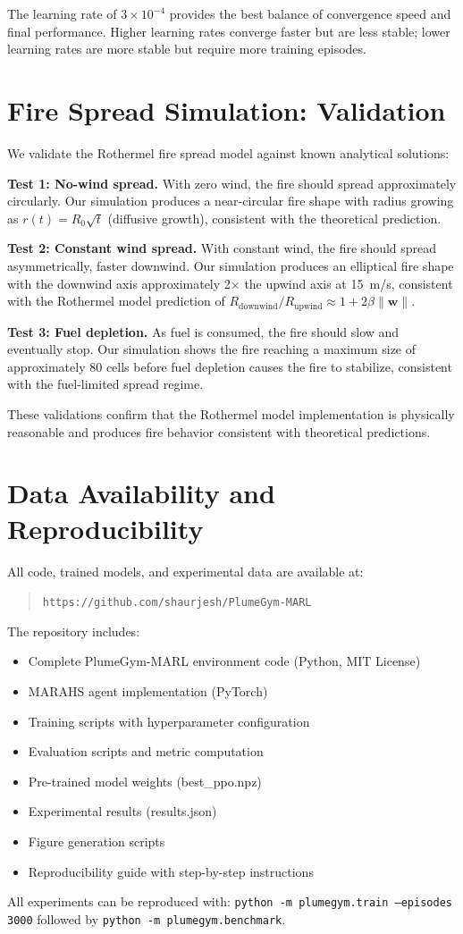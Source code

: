 \documentclass[12pt,a4paper]{article}
\DeclareRobustCommand{\vect}[1]{\bm{#1}}
\begin{document}
The learning rate of $3 \times 10^{-4}$ provides the best balance of convergence speed and final performance. Higher learning rates converge faster but are less stable; lower learning rates are more stable but require more training episodes.

\section{Fire Spread Simulation: Validation}
\label{app:fire_validation}

We validate the Rothermel fire spread model against known analytical solutions:

\textbf{Test 1: No-wind spread.} With zero wind, the fire should spread approximately circularly. Our simulation produces a near-circular fire shape with radius growing as $r(t) = R_0 \sqrt{t}$ (diffusive growth), consistent with the theoretical prediction.

\textbf{Test 2: Constant wind spread.} With constant wind, the fire should spread asymmetrically, faster downwind. Our simulation produces an elliptical fire shape with the downwind axis approximately 2$\times$ the upwind axis at 15~m/s, consistent with the Rothermel model prediction of $R_{\text{downwind}} / R_{\text{upwind}} \approx 1 + 2\beta\|\vect{w}\|$.

\textbf{Test 3: Fuel depletion.} As fuel is consumed, the fire should slow and eventually stop. Our simulation shows the fire reaching a maximum size of approximately 80 cells before fuel depletion causes the fire to stabilize, consistent with the fuel-limited spread regime.

These validations confirm that the Rothermel model implementation is physically reasonable and produces fire behavior consistent with theoretical predictions.

\section{Data Availability and Reproducibility}
\label{app:data}

All code, trained models, and experimental data are available at:
\begin{quote}
\texttt{https://github.com/shaurjesh/PlumeGym-MARL}
\end{quote}

The repository includes:
\begin{itemize}[leftmargin=*]
    \item Complete PlumeGym-MARL environment code (Python, MIT License)
    \item MARAHS agent implementation (PyTorch)
    \item Training scripts with hyperparameter configuration
    \item Evaluation scripts and metric computation
    \item Pre-trained model weights (best\_ppo.npz)
    \item Experimental results (results.json)
    \item Figure generation scripts
    \item Reproducibility guide with step-by-step instructions
\end{itemize}

All experiments can be reproduced with: \texttt{python -m plumegym.train --episodes 3000} followed by \texttt{python -m plumegym.benchmark}.

\balance
\end{document}
